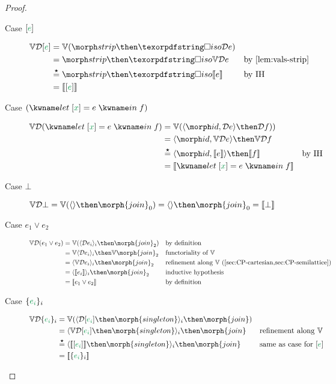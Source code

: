 \documentclass{rntz}\usepackage{fantasy}%
\begin{document}
\begin{proof}
\begin{description}
  \item[Case $\eboxd e$]
    \begin{align*}
      \vals\incdens{\eboxd e}
      &= \vals(\strip \then \isof{\incdens e})\\
      &= \strip \then \isof{\vals\incdens e}
      && \text{by \cref{lem:vals-strip}}\\
      &\stareq \strip \then \isof{\den e} && \text{by IH}\\
      &= \den{\eboxd e}
    \end{align*}

  \item[Case $(\elet{\eboxd x = e} f)$]
    \begin{align*}
      \vals\incden{\elet{\eboxd x = e} f}
      &= \vals(\tuple{\id, \incdens{e}} \then \incdens{f}))\\
      &= \tuple{\id, \vals\incdens e} \then \vals\incdens f\\
      &\stareq \tuple{\id, \den{e}} \then \den f &&\text{by IH}\\
      &= \den{\elet{\eboxd x = e} f}
    \end{align*}

  \item[Case $\bot$] \( \vals\incdens\bot = \vals{(\termI \then \morph{join}_0)}
    = \termI \then \morph{join}_0 = \den\bot \)

  \item[Case $e_1 \vee e_2$]
    \begin{align*}
      \vals{\incden{e_1 \vee e_2}}
      &= \vals{(\fork{\incdens{e_i}}_i \then \morph{join}_2)}
      && \text{by definition}\\
      &= \vals{\fork{\incdens{e_i}}_i} \then \vals{\morph{join}_2}
      && \text{functoriality of }\valfn\\
      &= \fork{\vals{\incdens{e_i}}}_i \then \morph{join}_2
      && \text{refinement along $\valfn$ (\cref{sec:CP-cartesian,sec:CP-semilattice})}\\
      &= \fork{\den{e_i}}_i \then \morph{join}_2
      && \text{inductive hypothesis}\\
      &= \den{e_1 \vee e_2}
      && \text{by definition}
    \end{align*}

  \item[Case $\esetd{e_i}_i$]
    \begin{align*}
      \vals{\incdens{\esetd{e_i}_i}}
      &= \vals{(\tuple{\incdens{\eboxd{e_i}} \then \morph{singleton}}_i \then \morph{join})}
      \\
      &= \tuple{\vals{\incdens{\eboxd{e_i}}} \then \morph{singleton}}_i \then \morph{join}
      && \text{refinement along \valfn}
      \\
      &\stareq \tuple{\den{\eboxd{e_i}} \then \morph{singleton}}_i \then \morph{join}
      && \text{same as case for $\eboxd e$}\\
      &= \den{\esetd{e_i}_i}
    \end{align*}


\end{description}
\end{proof}
\end{document}
